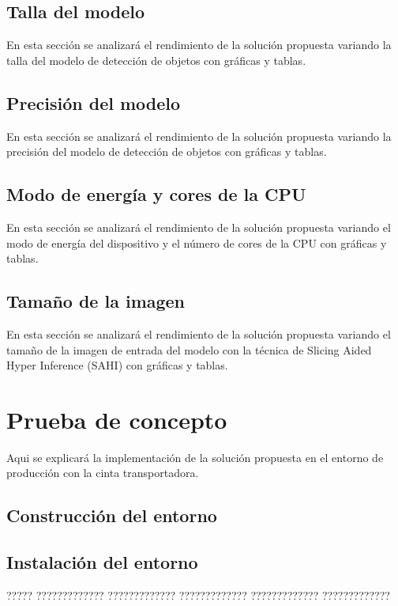 \documentclass[11pt,spanish,listoffigures,listoftables]{tfgetsinf}
\begin{document}
\section{Talla del modelo}
En esta sección se analizará el rendimiento de la solución propuesta variando la talla del modelo de detección de objetos con gráficas y tablas.

\section{Precisión del modelo}
En esta sección se analizará el rendimiento de la solución propuesta variando la precisión del modelo de detección de objetos con gráficas y tablas.

\section{Modo de energía y cores de la CPU}
En esta sección se analizará el rendimiento de la solución propuesta variando el modo de energía del dispositivo y el número de cores de la CPU con gráficas y tablas.

\section{Tamaño de la imagen}
En esta sección se analizará el rendimiento de la solución propuesta variando el tamaño de la imagen de entrada del modelo con la técnica de Slicing Aided Hyper Inference (SAHI) con gráficas y tablas.

\chapter{Prueba de concepto}
Aqui se explicará la implementación de la solución propuesta en el entorno de producción con la cinta transportadora.

\section{Construcción del entorno}

\section{Instalación del entorno}






????? ????????????? ????????????? ????????????? ????????????? ?????????????
\end{document}
